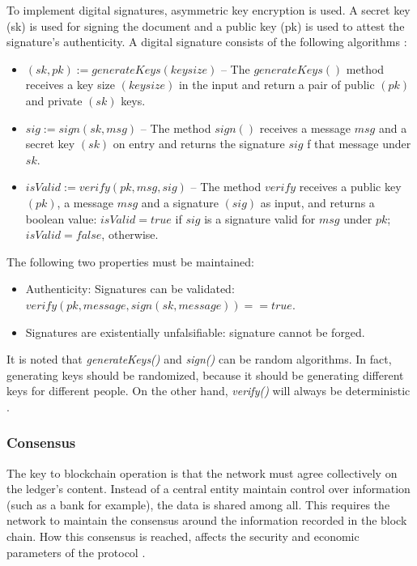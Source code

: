 To implement digital signatures, asymmetric key encryption is used. A secret key (sk) is used for signing the document and a public key (pk) is used to attest the signature's authenticity. A digital signature consists of the following algorithms \cite{greve2018blockchain}:

\begin{itemize}
\item $(sk , pk) := generateKeys(keysize)$ – The $generateKeys()$ method receives a key size $(keysize)$ in the input and return a pair of public $(pk)$ and private $(sk)$ keys.
\item $sig := sign(sk , msg)$ – The method $sign()$ receives a message $msg$ and a secret key $(sk)$ on entry and returns the signature $sig$ f that message under $sk$.
\item $isValid := veri f y(pk , msg , sig)$ – The method $verify$ receives a public key $(pk)$, a message $msg$ and a signature $(sig)$ as input, and returns a boolean value: $isValid = true$ if $sig$ is a signature valid for $msg$ under $pk$; $isValid = false$, otherwise.
\end{itemize}

The following two properties must be maintained:

\begin{itemize}
\item Authenticity: Signatures can be validated: \\ $verify(pk, message, sign(sk, message)) = = true$.
\item Signatures are existentially unfalsifiable: signature cannot be forged.
\end{itemize}

It is noted that \textit{generateKeys()} and \textit{sign()} can be random algorithms. In fact, generating keys should be randomized, because it should be generating different keys for different people. On the other hand, \textit{verify()} will always be deterministic \cite{greve2018blockchain}.

\subsubsection{Consensus}\label{sec:consenso}
The key to blockchain operation is that the network must agree collectively on the ledger's content. Instead of a central entity maintain control over information (such as a bank for example), the data is shared among all. This requires the network to maintain the consensus around the information recorded in the block chain. How this consensus is reached, affects the security and economic parameters of the protocol \cite{kostarev2017review}.

